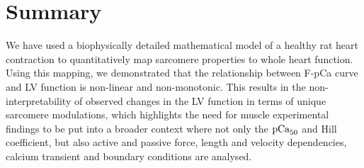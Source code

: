 

%
%
%
\section{Summary}\label{sec:ch8summary}
 We have used a biophysically detailed mathematical model of a healthy rat heart contraction to quantitatively map sarcomere properties to whole heart function. Using this mapping, we demonstrated that the relationship between F-pCa curve and LV function is non-linear and non-monotonic. This results in the non-interpretability of observed changes in the LV function in terms of unique sarcomere modulations, which highlights the need for muscle experimental findings to be put into a broader context where not only the $\textrm{pCa}_{50}$ and Hill coefficient, but also active and passive force, length and velocity dependencies, calcium transient and boundary conditions are analysed.